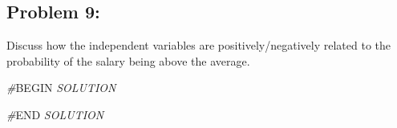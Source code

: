 \documentclass[
]{article}
\newenvironment{Shaded}{\begin{snugshade}}{\end{snugshade}}
\newcommand{\CommentTok}[1]{\textcolor[rgb]{0.56,0.35,0.01}{\textit{#1}}}
\newcommand{\RegionMarkerTok}[1]{#1}
\begin{document}
\hypertarget{problem-9}{%
\subsection{Problem 9:}\label{problem-9}}

Discuss how the independent variables are positively/negatively related
to the probability of the salary being above the average.

\begin{Shaded}
\begin{Highlighting}[]
\CommentTok{\#}\RegionMarkerTok{BEGIN}\CommentTok{ SOLUTION}

\CommentTok{\#}\RegionMarkerTok{END}\CommentTok{ SOLUTION}
\end{Highlighting}
\end{Shaded}
\end{document}
